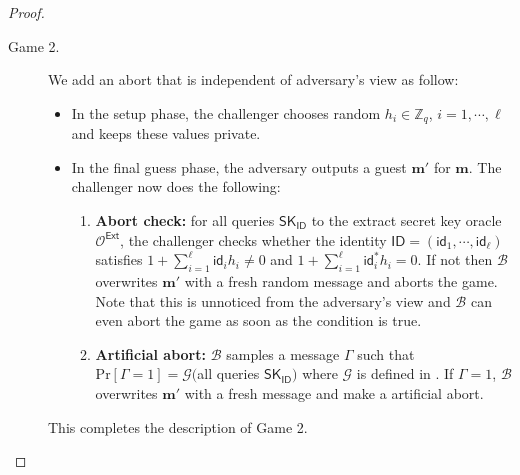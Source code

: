 \documentclass[runningheads,10pt]{llncs}
\def\ZZ{\mathbb{Z}}
\def\cal{\mathcal}
\def\bf{\mathbf}
\def\SK{\mathsf{SK}}
\def\Ext{\mathsf{Ext}}
\def\Pr{\mathrm{Pr}}
\def\ID{\mathsf{ID}}
\def\id{\mathsf{id}}
\begin{document}
\begin{proof}
\begin{description}
		\item[Game 2.] We add an abort that is independent of adversary's view as follow:
		\begin{itemize}
			\item In the setup phase, the challenger chooses random $h_i\in\ZZ_q$, $i=1,\cdots, \ell$ and keeps these values private.
			\item In the final guess phase, the adversary outputs a guest $\bf{m}'$ for $\bf{m}$. The challenger now does the following:
			\begin{enumerate}
				\item \textbf{Abort check:} for all queries $\SK_\ID$ to the extract secret key oracle $\cal{O}^\Ext$, the challenger checks whether the identity $\ID=(\id_1,\cdots,\id_\ell)$ satisfies $1+\sum_{i=1}^\ell\id_ih_i\ne 0$ and $1+\sum_{i=1}^\ell\id^*_ih_i= 0$. If not then $\cal{B}$ overwrites $\bf{m}'$ with a fresh random message and aborts the game. Note that this is unnoticed from the adversary's view and $\cal{B}$ can even abort the game as soon as the condition is true.
				\item \textbf{Artificial abort:} $\cal{B}$ samples a message $\Gamma$ such that $\Pr[\Gamma=1] = \cal{G}($all queries $\SK_\ID)$ where $\cal{G}$ is defined in \cite[Lemma 28]{ABB10-EuroCrypt}. If $\Gamma=1$, $\cal{B}$ overwrites $\bf{m}'$ with a fresh message and make a artificial abort.
			\end{enumerate}    
		\end{itemize}
		This completes the description of Game 2.\\
		

\end{description}
\end{proof}
\end{document}
